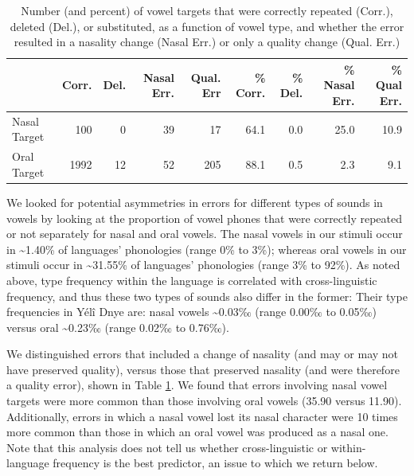 \documentclass[english,,man,floatsintext]{apa6}
\begin{document}
\begin{table}

\caption{\label{tab:tab-v}Number (and percent) of vowel targets that were correctly repeated (Corr.), deleted (Del.), or substituted, as a function of vowel type, and whether the error resulted in a nasality change (Nasal Err.) or only a quality change (Qual. Err.)}
\centering
\begin{tabular}[t]{lrrrrrrrr}
\toprule
  & Corr. & Del. & Nasal Err. & Qual. Err & \% Corr. & \% Del. & \% Nasal Err. & \% Qual Err.\\
\midrule
Nasal Target & 100 & 0 & 39 & 17 & 64.1 & 0.0 & 25.0 & 10.9\\
Oral Target & 1992 & 12 & 52 & 205 & 88.1 & 0.5 & 2.3 & 9.1\\
\bottomrule
\end{tabular}
\end{table}

We looked for potential asymmetries in errors for different types of sounds in vowels by looking at the proportion of vowel phones that were correctly repeated or not separately for nasal and oral vowels. The nasal vowels in our stimuli occur in \textasciitilde{}1.40\% of languages' phonologies (range 0\% to 3\%);
whereas oral vowels in our stimuli occur in \textasciitilde{}31.55\% of languages' phonologies (range 3\% to 92\%).
As noted above, type frequency within the language is correlated with cross-linguistic frequency, and thus these two types of sounds also differ in the former: Their type frequencies in Yélî Dnye are: nasal vowels \textasciitilde{}0.03‰ (range 0.00‰ to 0.05‰) versus oral \textasciitilde{}0.23‰ (range 0.02‰ to 0.76‰).

We distinguished errors that included a change of nasality (and may or may not have preserved quality), versus those that preserved nasality (and were therefore a quality error), shown in Table \ref{tab:tab-v}. We found that errors involving nasal vowel targets were more common than those involving oral vowels (35.90 versus 11.90). Additionally, errors in which a nasal vowel lost its nasal character were 10 times more common than those in which an oral vowel was produced as a nasal one. Note that this analysis does not tell us whether cross-linguistic or within-language frequency is the best predictor, an issue to which we return below.
\end{document}
